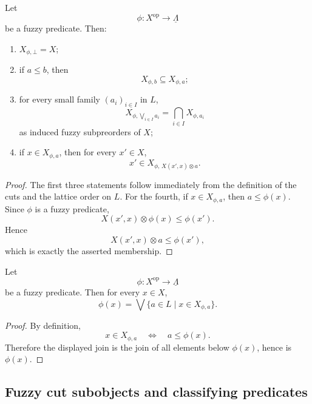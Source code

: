 \begin{proposition}
\label{prop:basic-properties-cut-family}
    Let
    \[
        \phi:X^{\mathrm{op}}\to\underline{\Lambda}
    \]
    be a fuzzy predicate. Then:
    \begin{enumerate}[label=\textup{(F\arabic*)}]
        \item \(X_{\phi,\bot}=X\);

        \item if \(a\leq b\), then
        \[
            X_{\phi,b}\subseteq X_{\phi,a};
        \]

        \item for every small family \((a_i)_{i\in I}\) in \(L\),
        \[
            X_{\phi,\bigvee_{i\in I}a_i}
            =
            \bigcap_{i\in I}X_{\phi,a_i}
        \]
        as induced fuzzy subpreorders of \(X\);

        \item if \(x\in X_{\phi,a}\), then for every \(x'\in X\),
        \[
            x'\in X_{\phi,\,X(x',x)\otimes a}.
        \]
    \end{enumerate}
\end{proposition}

\begin{proof}
    The first three statements follow immediately from the definition of the cuts and the lattice order on \(L\). For the fourth, if \(x\in X_{\phi,a}\), then \(a\leq\phi(x)\). Since \(\phi\) is a fuzzy predicate,
    \[
        X(x',x)\otimes\phi(x)\leq\phi(x').
    \]
    Hence
    \[
        X(x',x)\otimes a\leq\phi(x'),
    \]
    which is exactly the asserted membership.
\end{proof}

\begin{proposition}
\label{prop:recovery-classifying-predicate}
    Let
    \[
        \phi:X^{\mathrm{op}}\to\underline{\Lambda}
    \]
    be a fuzzy predicate. Then for every \(x\in X\),
    \[
        \phi(x)=\bigvee\{a\in L\mid x\in X_{\phi,a}\}.
    \]
\end{proposition}

\begin{proof}
    By definition,
    \[
        x\in X_{\phi,a}
        \quad\Longleftrightarrow\quad
        a\leq\phi(x).
    \]
    Therefore the displayed join is the join of all elements below \(\phi(x)\), hence is \(\phi(x)\).
\end{proof}

\subsection{Fuzzy cut subobjects and classifying predicates}
\label{subsec:fuzzy-subobjects-and-classifying-predicates}

